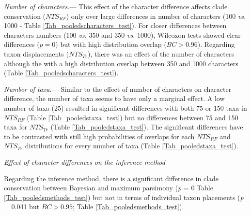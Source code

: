 \documentclass[12pt,letterpaper]{article}
\renewcommand{\subsection}[1]{%
\bigskip
\begin{center}
\begin{large}
\normalfont\itshape #1
\end{large}
\end{center}}
\renewcommand{\subsubsection}[1]{%
\vspace{2ex}
\noindent
\textit{#1.}---}
\begin{document}


\subsubsection{Number of characters}
This effect of the character difference affects clade conservation ($NTS_{RF}$) only over large differences in number of characters (100 \textit{vs.} 1000 - Table \ref{Tab_pooledscharacters_test}).
For closer differences between characters numbers (100 \textit{vs.} 350 and 350 \textit{vs.} 1000), Wilcoxon tests showed clear differences ($p = 0$) but with high distribution overlap ($BC > 0.96$).
Regarding taxon displacements ($NTS_{Tr}$), there was an effect of the number of characters  although the with a high distribution overlap between 350 and 1000 characters (Table \ref{Tab_pooledscharacters_test}).



\subsubsection{Number of taxa}
Similar to the effect of number of characters on character difference, the number of taxa seems to have only a marginal effect.
A low number of taxa (25) resulted in significant differences with both 75 or 150 taxa in $NTS_{RF}$ (Table \ref{Tab_pooledstaxa_test}) but no differences between 75 and 150 taxa for $NTS_{Tr}$ (Table \ref{Tab_pooledstaxa_test}).
The significant differences have to be contrasted with still high probabilities of overlaps for each $NTS_{RF}$ and $NTS_{Tr}$ distributions for every number of taxa (Table \ref{Tab_pooledstaxa_test}).



\subsection{Effect of character differences on the inference method}
Regarding the inference method, there is a significant difference in clade conservation between Bayesian and maximum parsimony (\textit{p} = 0 Table \ref{Tab_pooledsmethods_test}) but not in terms of individual taxon placements (\textit{p} = 0.041 but $BC > 0.95$; Table \ref{Tab_pooledsmethods_test}).



\end{document}
